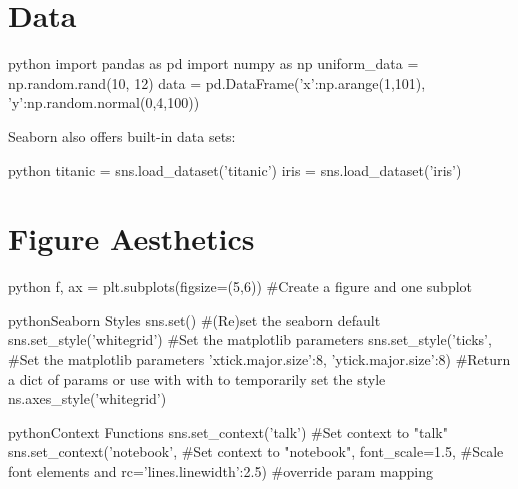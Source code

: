 \section{Data}

\begin{myblock}{}
\begin{codebox}{python}{}
import pandas as pd
import numpy as np
uniform_data = np.random.rand(10, 12)
data = pd.DataFrame({'x':np.arange(1,101),
                     'y':np.random.normal(0,4,100)})
\end{codebox}

{Seaborn also offers built-in data sets:}
\begin{codebox}{python}{}
titanic = sns.load_dataset('titanic')
iris = sns.load_dataset('iris')
\end{codebox}
\end{myblock}


\section{Figure Aesthetics}

\begin{codebox}{python}{}
f, ax = plt.subplots(figsize=(5,6))  #Create a figure and one subplot
\end{codebox}

\begin{codebox}{python}{Seaborn Styles}
sns.set()  #(Re)set the seaborn default
sns.set_style('whitegrid')  #Set the matplotlib parameters
sns.set_style('ticks',  #Set the matplotlib parameters
              {'xtick.major.size':8,
               'ytick.major.size':8})
#Return a dict of params or use with with to temporarily set the style
ns.axes_style('whitegrid')
\end{codebox}

\begin{codebox}{python}{Context Functions}
sns.set_context('talk')  #Set context to "talk"
sns.set_context('notebook',  #Set context to "notebook",
                font_scale=1.5,  #Scale font elements and
                rc={'lines.linewidth':2.5})  #override param mapping
\end{codebox}




